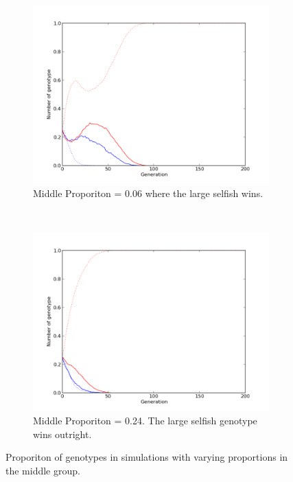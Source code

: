 \documentclass[11pt]{ecsarticle}
\begin{document}
\begin{figure}
        \begin{subfigure}[b]{0.4\textwidth}
                \includegraphics[width=\textwidth]{Code2/mprop_06_selfish.png}
                \caption{Middle Proporiton = 0.06 where the large selfish wins.}
                \label{fig:ext:6:s}
        \end{subfigure}
        ~
        \begin{subfigure}[b]{0.4\textwidth}
                \includegraphics[width=\textwidth]{Code2/mprop_24.png}
                \caption{Middle Proporiton = 0.24. The large selfish genotype wins outright.}
                \label{fig:ext:24}
        \end{subfigure}
        \caption{Proporiton of genotypes in simulations with varying proportions in the middle group.}\label{fig:ext:manyresults}
\end{figure}
\end{document}
